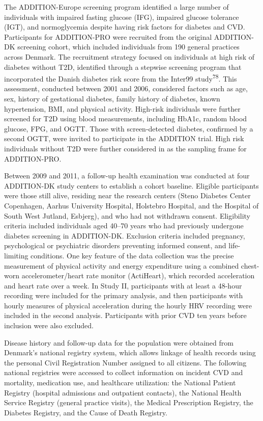 \documentclass[
  letterpaper,
  headsepline=true,
  open=any]{scrbook}
\begin{document}
The ADDITION-Europe screening program identified a large number of
individuals with impaired fasting glucose (IFG), impaired glucose
tolerance (IGT), and normoglycemia despite having risk factors for
diabetes and CVD. Participants for ADDITION-PRO were recruited from the
original ADDITION-DK screening cohort, which included individuals from
190 general practices across Denmark. The recruitment strategy focused
on individuals at high risk of diabetes without T2D, identified through
a stepwise screening program that incorporated the Danish diabetes risk
score from the Inter99 study\textsuperscript{78}. This assessment,
conducted between 2001 and 2006, considered factors such as age, sex,
history of gestational diabetes, family history of diabetes, known
hypertension, BMI, and physical activity. High-risk individuals were
further screened for T2D using blood measurements, including HbA1c,
random blood glucose, FPG, and OGTT. Those with screen-detected
diabetes, confirmed by a second OGTT, were invited to participate in the
ADDITION trial. High risk individuals without T2D were further
considered in as the sampling frame for ADDITION-PRO.

Between 2009 and 2011, a follow-up health examination was conducted at
four ADDITION-DK study centers to establish a cohort baseline. Eligible
participants were those still alive, residing near the research centers
(Steno Diabetes Center Copenhagen, Aarhus University Hospital, Holstebro
Hospital, and the Hospital of South West Jutland, Esbjerg), and who had
not withdrawn consent. Eligibility criteria included individuals aged
40--70 years who had previously undergone diabetes screening in
ADDITION-DK. Exclusion criteria included pregnancy, psychological or
psychiatric disorders preventing informed consent, and life-limiting
conditions. One key feature of the data collection was the precise
measurement of physical activity and energy expenditure using a combined
chest-worn accelerometer/heart rate monitor (ActiHeart), which recorded
acceleration and heart rate over a week. In Study II, participants with
at least a 48-hour recording were included for the primary analysis, and
then participants with hourly measures of physical acceleration during
the hourly HRV recording were included in the second analysis.
Participants with prior CVD ten years before inclusion were also
excluded.

Disease history and follow-up data for the population were obtained from
Denmark's national registry system, which allows linkage of health
records using the personal Civil Registration Number assigned to all
citizens. The following national registries were accessed to collect
information on incident CVD and mortality, medication use, and
healthcare utilization: the National Patient Registry (hospital
admissions and outpatient contacts), the National Health Service
Registry (general practice visits), the Medical Prescription Registry,
the Diabetes Registry, and the Cause of Death Registry.
\end{document}
